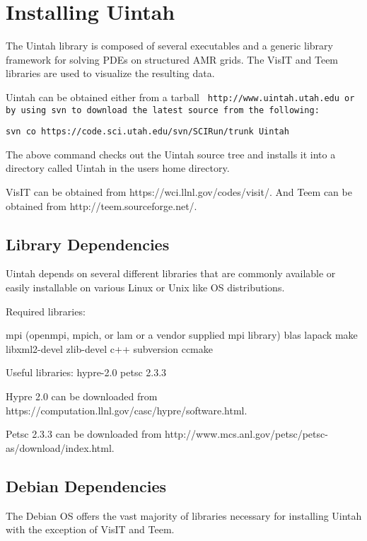 \section{Installing Uintah} \label{Sec:installation}

The Uintah library is composed of several executables and a generic
library framework for solving PDEs on structured AMR grids.  The VisIT
and Teem libraries are used to visualize the resulting data.

Uintah can be obtained either from a tarball \tt
http://www.uintah.utah.edu \normalfont or by using svn to download the
latest source from the following:

\begin{Verbatim}[fontsize=\footnotesize]
  svn co https://code.sci.utah.edu/svn/SCIRun/trunk Uintah
\end{Verbatim}

The above command checks out the Uintah source tree and installs it
into a directory called Uintah in the users home directory.

VisIT can be obtained from https://wci.llnl.gov/codes/visit/. And Teem
can be obtained from http://teem.sourceforge.net/.


\subsection{Library Dependencies}

Uintah depends on several different libraries that are commonly
available or easily installable on various Linux or Unix like OS
distributions.  

Required libraries:

mpi (openmpi, mpich, or lam or a vendor supplied mpi library)
blas
lapack
make
libxml2-devel
zlib-devel
c++
subversion
ccmake

Useful libraries:
hypre-2.0
petsc 2.3.3

Hypre 2.0 can be downloaded from
https://computation.llnl.gov/casc/hypre/software.html.

Petsc 2.3.3 can be downloaded from
http://www.mcs.anl.gov/petsc/petsc-as/download/index.html.


\subsection{Debian Dependencies}

The Debian OS offers the vast majority of libraries necessary for
installing Uintah with the exception of VisIT and Teem.

